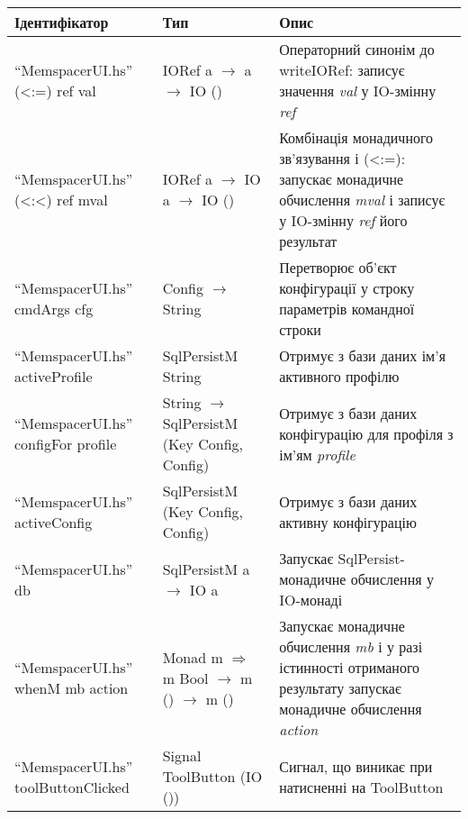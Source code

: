 \small\begin{longtable}{| C{6cm} | C{4cm} | C{5cm} |}
  \hline
  Ідентифікатор & Тип & Опис \\
  \hline
  ``MemspacerUI.hs'' \newline (<:=) \newline ref val
  & IORef a $\to$ a $\to$ IO ()
  & Операторний синонім до writeIORef: записує значення \emph{val}
  у IO-змінну \emph{ref} \\
  \hline
  ``MemspacerUI.hs'' \newline (<:<) \newline ref mval
  & IORef a $\to$ IO a $\to$ IO ()
  & Комбінація монадичного зв'язування і (<:=):
  запускає монадичне обчислення \emph{mval} і записує
  у IO-змінну \emph{ref} його результат \\
  \hline
  ``MemspacerUI.hs'' \newline cmdArgs \newline cfg
  & Config $\to$ String
  & Перетворює об'єкт конфігурації у строку параметрів командної строки \\
  \hline
  ``MemspacerUI.hs'' \newline activeProfile
  & SqlPersistM String
  & Отримує з бази даних ім'я активного профілю \\
  \hline
  ``MemspacerUI.hs'' \newline configFor \newline profile
  & String $\to$ SqlPersistM (Key Config, Config)
  & Отримує з бази даних конфігурацію для профіля з ім'ям \emph{profile} \\
  \hline
  ``MemspacerUI.hs'' \newline activeConfig
  & SqlPersistM (Key Config, Config)
  & Отримує з бази даних активну конфігурацію \\
  \hline
  ``MemspacerUI.hs'' \newline db
  & SqlPersistM a $\to$ IO a
  & Запускає SqlPersist-монадичне обчислення у IO-монаді \\
  \hline
  ``MemspacerUI.hs'' \newline whenM \newline mb action
  & Monad m $\Rightarrow$ m Bool $\to$ m () $\to$ m ()
  & Запускає монадичне обчислення \emph{mb} і у разі істинності
  отриманого результату запускає монадичне обчислення \emph{action} \\
  \hline
  ``MemspacerUI.hs'' \newline toolButtonClicked
  & Signal ToolButton (IO ())
  & Сигнал, що виникає при натисненні на ToolButton \\

\end{longtable}
